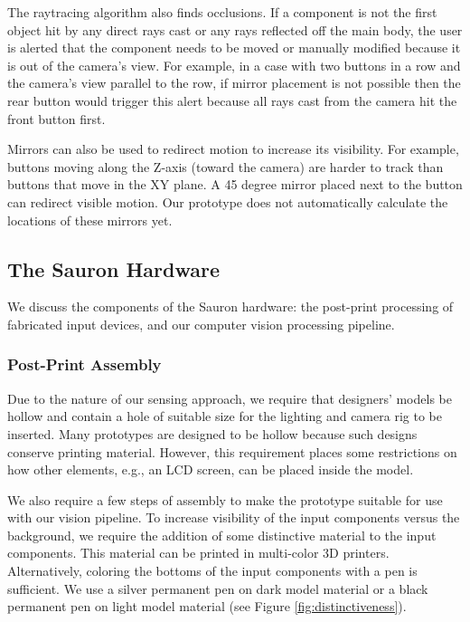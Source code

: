 The raytracing algorithm also finds occlusions. If a component %
is not the first object hit by any direct rays cast or any rays reflected off the main body, the user is alerted that the component needs to be moved or manually modified because it is out of the camera's view. For example, in a case with two buttons in a row and the camera's view parallel to the row, if mirror placement is not possible then the rear button would trigger this alert because all rays cast from the camera hit the front button first.

Mirrors can also be used to redirect motion to increase its visibility. For example, buttons moving along the Z-axis (toward the camera) are harder to track than buttons that move in the XY plane. A 45 degree mirror placed next to the button can redirect visible motion. Our prototype does not automatically calculate the locations of these mirrors yet.

    \subsection{The Sauron Hardware}
    
    We discuss the components of the Sauron hardware: the post-print processing of fabricated input devices, and our computer vision processing pipeline.

\subsubsection{Post-Print Assembly}
Due to the nature of our sensing approach, we require that designers' models be hollow and contain a hole of suitable size for the lighting and camera rig to be inserted. Many prototypes are designed to be hollow because such designs conserve printing material. However, this requirement places some restrictions on how other elements, e.g., an LCD screen, can be placed inside the model. 

We also require a few steps of assembly to make the prototype suitable for use with our vision pipeline.
To increase visibility of the input components versus the background, we require the addition of some distinctive material to the input components. This material can be printed in multi-color 3D printers. Alternatively, coloring the bottoms of the input components with a pen is sufficient. We use a silver permanent pen on dark model material or a black permanent pen on light model material (see Figure \ref{fig:distinctiveness}).


